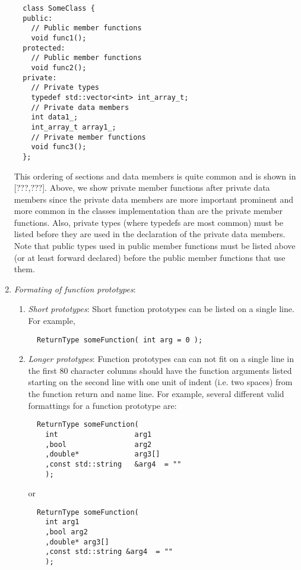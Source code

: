 \begin{enumerate}
{\small\begin{verbatim}
  class SomeClass {
  public:
    // Public member functions
    void func1();
  protected:
    // Public member functions
    void func2();
  private:
    // Private types
    typedef std::vector<int> int_array_t;
    // Private data members
    int data1_;
    int_array_t array1_;
    // Private member functions
    void func3();
  };
\end{verbatim}}

This ordering of sections and data members is quite common and is shown in
[???,???].  Above, we show private member functions after private data members
since the private data members are more important prominent and more common in
the classes implementation than are the private member functions.  Also,
private types (where typedefs are most common) must be listed before they are
used in the declaration of the private data members.  Note that public types
used in public member functions must be listed above (or at least forward
declared) before the public member functions that use them.

{}\item\textit{Formating of function prototypes}:

  \begin{enumerate}

  {}\item\textit{Short prototypes}: Short function prototypes can be listed
  on a single line.  For example,

  {\small\begin{verbatim}
  ReturnType someFunction( int arg = 0 );
  \end{verbatim}}

  {}\item\textit{Longer prototypes}: Function prototypes can can not fit on a
  single line in the first 80 character columns should have the function
  arguments listed starting on the second line with one unit of indent
  (i.e. two spaces) from the function return and name line.  For example,
  several different valid formattings for a function prototype are:

  {\small\begin{verbatim}
  ReturnType someFunction(
    int                  arg1
    ,bool                arg2
    ,double*             arg3[]
    ,const std::string   &arg4  = ""
    );
  \end{verbatim}}
  
  or
  
  {\small\begin{verbatim}
  ReturnType someFunction(
    int arg1
    ,bool arg2
    ,double* arg3[]
    ,const std::string &arg4  = ""
    );
  \end{verbatim}}
  

\end{enumerate}
\end{enumerate}
